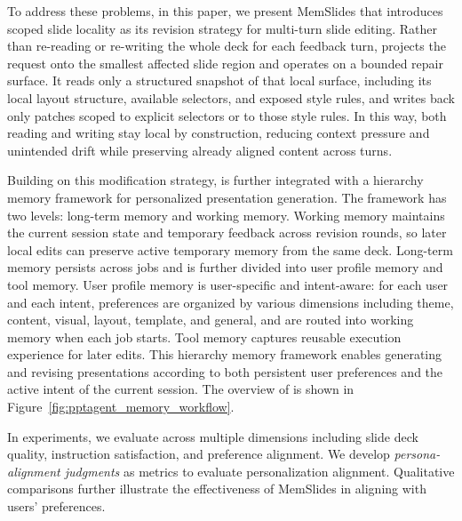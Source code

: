 To address these problems, in this paper, we present MemSlides that introduces scoped slide
locality as its revision strategy for multi-turn slide editing. Rather
than re-reading or re-writing the whole deck for each feedback turn,
\methodname projects the request onto the smallest affected slide region and
operates on a bounded repair surface. It reads only a structured snapshot of
that local surface, including its local layout structure, available selectors,
and exposed style rules, and writes back only patches scoped to explicit
selectors or to those style rules. In this way, both reading and writing stay
local by construction, reducing context pressure and unintended drift while
preserving already aligned content across turns.

Building on this modification strategy, \methodname is further integrated with a hierarchy memory
framework for personalized presentation generation. The framework has two
levels: long-term memory and working memory. Working memory maintains the
current session state and temporary feedback across revision rounds, so later
local edits can preserve active temporary memory from the same deck.
Long-term memory persists across jobs and is further divided into user profile
memory and tool memory. User profile memory is user-specific and intent-aware:
for each user and each intent, preferences are organized by various
dimensions including theme, content, visual, layout, template, and general, and are routed into working memory when each job starts. 
Tool memory captures reusable execution experience for later edits. This
hierarchy memory framework enables generating and revising presentations according to both
persistent user preferences and the active intent of the current session. The overview of \methodname is shown in Figure~\ref{fig:pptagent_memory_workflow}.

In experiments, we evaluate \methodname 
across multiple dimensions including slide deck quality, instruction satisfaction, and preference alignment. 
We develop \emph{persona-alignment judgments} as metrics to evaluate personalization alignment. 
Qualitative comparisons further illustrate the effectiveness of MemSlides in aligning with users' preferences.

